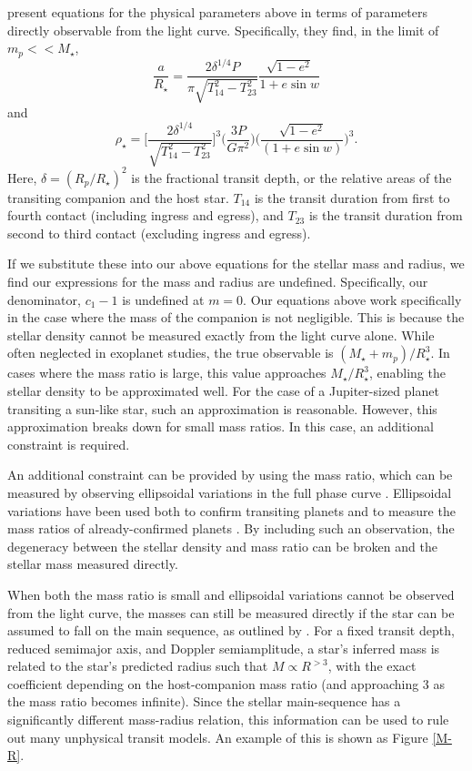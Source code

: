 \citet{Dawson12a} present equations for the physical parameters above in terms of parameters directly observable from the light curve. 
Specifically, they find, in the limit of $m_p << M_\star$,
\begin{equation}
\frac{a}{R_\star} = \frac{2 \delta^{1/4} P}{\pi \sqrt{T^2_{14} - T^2_{23}}} \frac{\sqrt{1-e^2}}{1+e \sin w} 
\end{equation}
and
\begin{equation}
\rho_\star = \bigg[\frac{2 \delta^{1/4}}{ \sqrt{T^2_{14} - T^2_{23}}}\bigg]^3 \bigg(\frac{3P}{G\pi^2}\bigg)\bigg(\frac{\sqrt{1-e^2}}{(1+e \sin w)}\bigg)^3.
\end{equation}
Here, $\delta = (R_p / R_\star)^2$ is the fractional transit depth, or the relative areas of the transiting companion and the host star. 
$T_{14}$ is the transit duration from first to fourth contact (including ingress and egress), and $T_{23}$ is the transit duration from second to third contact (excluding ingress and egress).
 
If we substitute these into our above equations for the stellar mass and radius, we find our expressions for the mass and radius are undefined. 
Specifically, our denominator, $c_1 - 1$ is undefined at $m = 0$. 
Our equations above work specifically in the case where the mass of the companion is not negligible. 
This is because the stellar density cannot be measured exactly from the light curve alone.
While often neglected in exoplanet studies, the true observable is $(M_\star + m_p)/R_\star^3$. 
In cases where the mass ratio is large, this value approaches $M_\star / R_\star^3$, enabling the stellar density to be approximated well.
For the case of a Jupiter-sized planet transiting a sun-like star, such an approximation is reasonable.
However, this approximation breaks down for small mass ratios.
In this case, an additional constraint is required.

An additional constraint can be provided by using the mass ratio, which can be measured by observing ellipsoidal variations in the full phase curve \citep{Loeb03}. 
Ellipsoidal variations have been used both to confirm transiting planets \citep[e.g.][]{Mislis12} and to measure the mass ratios of already-confirmed planets \citep[e.g.][]{Welsh10, Jackson12}. 
By including such an observation, the degeneracy between the stellar density and mass ratio can be broken and the stellar mass measured directly.

When both the mass ratio is small and ellipsoidal variations cannot be observed from the light curve, the masses can still be measured directly if the star can be assumed to fall on the main sequence, as outlined by \citet{Seager03}. 
For a fixed transit depth, reduced semimajor axis, and Doppler semiamplitude, a star's inferred mass is related to the star's predicted radius such that $M \propto R^{>3}$, with the exact coefficient depending on the host-companion mass ratio (and approaching 3 as the mass ratio becomes infinite). Since the stellar main-sequence has a significantly different mass-radius relation, this information can be used to rule out many unphysical transit models. An example of this is shown as Figure \ref{M-R}.

